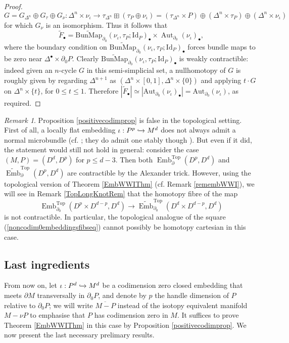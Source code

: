 \documentclass[a4paper, oneside]{amsart}
\newcommand{\emb}{\operatorname{Emb}}
\newcommand{\bemb}{\widetilde{\operatorname{Emb}}}
\newcommand{\Id}{\mathrm{Id}}
\newcommand{\1}{\mathds{1}}
\theoremstyle{remark}
\newtheorem{rem}[thm]{Remark}%
\theoremstyle{definition}
\numberwithin{equation}{section}
\begin{document}
\begin{proof}
     $$
     G=G_{\Delta^n}\oplus G_\tau\oplus G_\nu: \Delta^n\times \nu_\iota\longrightarrow \tau_{\Delta^n}\boxplus(\tau_P\oplus \nu_\iota)=(\tau_{\Delta^n}\times P)\oplus(\Delta^n\times\tau_P)\oplus(\Delta^n\times\nu_\iota)
     $$
for which $G_\nu$ is an isomorphism. Thus it follows that 
$$
\widetilde{F}_\bullet=\operatorname{\widetilde{BunMap}}_{\partial_0}(\nu_\iota,\tau_P;\Id_P)_\bullet\times\operatorname{Aut}_{\partial_0}(\nu_\iota)_\bullet,
$$
where the boundary condition on $\operatorname{\widetilde{BunMap}}_{\partial_0}(\nu_\iota,\tau_P;\Id_P)_\bullet$ forces bundle maps to be zero near $\Delta^\bullet\times\partial_0P$. Clearly $\operatorname{\widetilde{BunMap}}_{\partial_0}(\nu_\iota,\tau_P;\Id_P)_\bullet$ is weakly contractible: indeed given an $n$-cycle $G$ in this semi-simplicial set, a nullhomotopy of $G$ is roughly given by regarding $\Delta^{n+1}$ as $(\Delta^n\times [0,1],\Delta^{n}\times\{0\})$ and applying $t\cdot G$ on $\Delta^{n}\times\{t\}$, for $0\leq t\leq 1$. Therefore $|\widetilde{F}_\bullet|\simeq |\mathrm{Aut}_{\partial_0}(\nu_\iota)_\bullet|=\mathrm{Aut}_{\partial_0}(\nu_\iota)$, as required.
\end{proof}

\begin{rem}\label{codimzerotopremark}
    Proposition \ref{positivecodimprop} is false in the topological setting. First of all, a locally flat embedding $\iota: P^p\xhookrightarrow{}M^d$ does not always admit a normal microbundle (cf. \cite{RourkeSanderson}; they do admit one stably though \cite[Thm. B]{Hirschmicrobundle}). But even if it did, the statement would still not hold in general: consider the case $(M,P)=(D^d,D^p)$ for $p\leq d-3$. Then both $\emb_{\partial}^{\mathrm{Top}}(D^p,D^d)$ and $\bemb_{\partial}^{\mathrm{Top}}(D^p,D^d)$ are contractible by the Alexander trick. However, using the topological version of Theorem \ref{EmbWWIThm} (cf. Remark \ref{remembWWI}), we will see in Remark \ref{TopLongKnotRem} that the homotopy fibre of the map
    $$
\emb_{\partial_0}^{\mathrm{Top}}(D^p\times D^{d-p}, D^d)\longrightarrow \bemb_{\partial_0}^{\mathrm{Top}}(D^d\times D^{d-p},D^d)
    $$
    is not contractible. In particular, the topological analogue of the square (\ref{noncodim0embeddingsfibseq}) cannot possibly be homotopy cartesian in this case.
\end{rem}


\subsection{Last ingredients}\label{lastingrsection} From now on, let $\iota: P^d\xhookrightarrow{}M^d$ be a codimension zero closed embedding that meets $\partial M$ transversally in $\partial_0 P$, and denote by $p$ the handle dimension of $P$ relative to $\partial_0 P$; we will write $\overline{M-P}$ instead of the isotopy equivalent manifold $M-\nu P$ to emphasise that $P$ has codimension zero in $M$. It suffices to prove Theorem \ref{EmbWWIThm} in this case by Proposition \ref{positivecodimprop}. We now present the last necessary prelimary results. 
\end{document}
